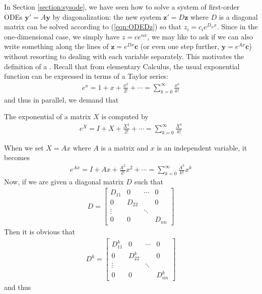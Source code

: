 In Section \ref{section:sysode}, we have seen how to solve a system of first-order ODEs $\textbf{y}' = A\textbf{y}$ by diagonalization: the new system $\textbf{z}' = D\textbf{z}$ where $D$ is a diagonal matrix can be solved according to (\ref{eqn:ODEDz}) so that $z_{i} = c_ie^{D_{ii}x}$. Since in the one-dimensional case, we simply have $z = ce^{\alpha x}$, we may like to ask if we can also write something along the lines of $\textbf{z} = e^{Dx}\textbf{c}$ (or even one step further, $\textbf{y} = e^{Ax}\textbf{c}$) without resorting to dealing with each variable separately. This motivates the definition of a . Recall that from elementary Calculus, the usual exponential function can be expressed in terms of a Taylor series:
\begin{align*}
e^{x} = 1 + x + \frac{x^2}{2!} + \cdots = \sum_{k=0}^{\infty} \frac{x^k}{k!}
\end{align*}
and thus in parallel, we demand that
\begin{defn}
The exponential of a matrix $X$ is computed by
\begin{align}
e^{X} = I + X + \frac{X^2}{2!} + \cdots = \sum_{k=0}^{\infty} \frac{X^k}{k!}
\end{align}
\end{defn}
When we set $X = Ax$ where $A$ is a matrix and $x$ is an independent variable, it becomes
\begin{align}
e^{Ax} = I + Ax + \frac{A^2}{2!}x^2 + \cdots = \sum_{k=0}^{\infty} \frac{A^k}{k!}x^k  
\end{align}
Now, if we are given a diagonal matrix $D$ such that
\begin{align*}
D = \begin{bmatrix}
D_{11} & 0 & \cdots & 0 \\
0 & D_{22} & & 0 \\
\vdots & & \ddots \\
0 & 0 & & D_{nn}
\end{bmatrix}
\end{align*}
Then it is obvious that
\begin{align*}
D^k =  \begin{bmatrix}
D_{11}^k & 0 & \cdots & 0 \\
0 & D_{22}^k & & 0 \\
\vdots & & \ddots \\
0 & 0 & & D_{nn}^k
\end{bmatrix}
\end{align*}
and thus
